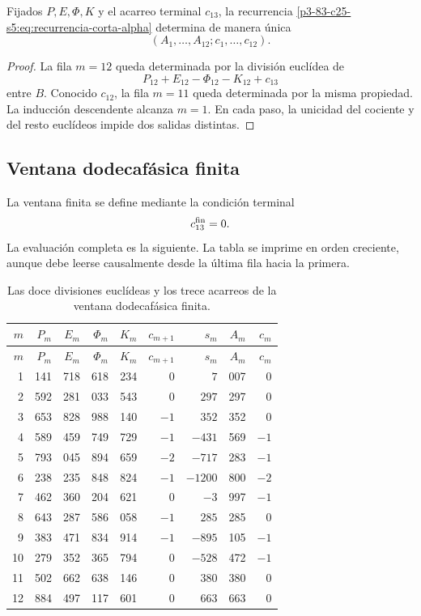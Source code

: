 \begin{theorem}
\label{p3-83-c25-s5:thm:unicidad-acarreo-orientado-alpha}
Fijados \(P,E,\Phi,K\) y el acarreo terminal \(c_{13}\), la recurrencia
\eqref{p3-83-c25-s5:eq:recurrencia-corta-alpha} determina de manera única
\[
 (A_1,\ldots,A_{12};c_1,\ldots,c_{12}).
\]
\end{theorem}

\begin{proof}
La fila \(m=12\) queda determinada por la división euclídea de
\[
 P_{12}+E_{12}-\Phi_{12}-K_{12}+c_{13}
\]
entre \(B\). Conocido \(c_{12}\), la fila \(m=11\) queda determinada por
la misma propiedad. La inducción descendente alcanza \(m=1\). En cada
paso, la unicidad del cociente y del resto euclídeos impide dos salidas
distintas.
\end{proof}

\subsection{Ventana dodecafásica finita}

La ventana finita se define mediante la condición terminal
\[
 c_{13}^{\rm fin}=0.
\]
La evaluación completa es la siguiente. La tabla se imprime en orden
creciente, aunque debe leerse causalmente desde la última fila hacia la
primera.

\begingroup
\scriptsize
\setlength{\tabcolsep}{3.2pt}
\begin{longtable}{@{}r|rrrr|r|r|r|r@{}}
\caption{Las doce divisiones euclídeas y los trece acarreos de la ventana
dodecafásica finita.}
\label{p3-83-c25-s5:tab:acarreo-alpha-finito-autonomo}\\
\toprule
\(m\)&\(P_m\)&\(E_m\)&\(\Phi_m\)&\(K_m\)&
\(c_{m+1}\)&\(s_m\)&\(A_m\)&\(c_m\)\\
\midrule
\endfirsthead
\toprule
\(m\)&\(P_m\)&\(E_m\)&\(\Phi_m\)&\(K_m\)&
\(c_{m+1}\)&\(s_m\)&\(A_m\)&\(c_m\)\\
\midrule
\endhead
1  &141&718&618&234& \(0\)& \(7\)&007& \(0\)\\
2  &592&281&033&543& \(0\)& \(297\)&297& \(0\)\\
3  &653&828&988&140& \(-1\)& \(352\)&352& \(0\)\\
4  &589&459&749&729& \(-1\)& \(-431\)&569& \(-1\)\\
5  &793&045&894&659& \(-2\)& \(-717\)&283& \(-1\)\\
6  &238&235&848&824& \(-1\)& \(-1200\)&800& \(-2\)\\
7  &462&360&204&621& \(0\)& \(-3\)&997& \(-1\)\\
8  &643&287&586&058& \(-1\)& \(285\)&285& \(0\)\\
9  &383&471&834&914& \(-1\)& \(-895\)&105& \(-1\)\\
10 &279&352&365&794& \(0\)& \(-528\)&472& \(-1\)\\
11 &502&662&638&146& \(0\)& \(380\)&380& \(0\)\\
12 &884&497&117&601& \(0\)& \(663\)&663& \(0\)\\
\bottomrule
\end{longtable}
\endgroup

